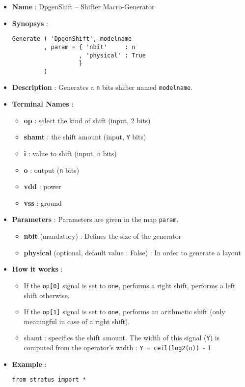\begin{itemize}
    \item \textbf{Name} : DpgenShift -- Shifter Macro-Generator
    \item \textbf{Synopsys} :
\begin{verbatim}
Generate ( 'DpgenShift', modelname
         , param = { 'nbit'     : n
                   , 'physical' : True         
                   }
         )
\end{verbatim}
    \item \textbf{Description} : Generates a \verb-n- bits shifter named \verb-modelname-.
    \item \textbf{Terminal Names} :
    \begin{itemize}
        \item \textbf{op} : select the kind of shift (input, 2 bits)
        \item \textbf{shamt} : the shift amount (input, \verb-Y- bits)
        \item \textbf{i} : value to shift (input, \verb-n- bits)
        \item \textbf{o} : output (\verb-n- bits)
        \item \textbf{vdd} : power
        \item \textbf{vss} : ground
    \end{itemize}
    \item \textbf{Parameters} : Parameters are given in the map \verb-param-.
    \begin{itemize}
        \item \textbf{nbit} (mandatory) : Defines the size of the generator
        \item \textbf{physical} (optional, default value : False) : In order to generate a layout
    \end{itemize}
    \item \textbf{How it works} :
    \begin{itemize}
        \item If the \verb-op[0]- signal is set to \verb-one-, performs a right shift, performs a left shift otherwise.
        \item If the \verb-op[1]- signal is set to \verb-one-, performs an arithmetic shift (only meaningful in case of a right shift).
        \item shamt : specifies the shift amount. The width of this signal (\verb-Y-) is computed from the operator's width : \verb-Y = ceil(log2(n)) -- 1
    \end{itemize}    
    \item \textbf{Example} :
\begin{verbatim}
from stratus import *


\end{verbatim}
\end{itemize}
